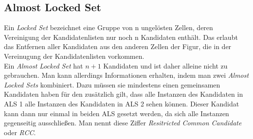 \newpage
\subsection{Almost Locked Set}
Ein \textit{Locked Set} bezeichnet eine Gruppe von n ungelösten Zellen, deren Vereinigung der Kandidatenlisten nur noch n Kandidaten enthält. Das erlaubt das Entfernen aller Kandidaten aus den anderen Zellen der Figur, die in der Vereinugung der Kandidatenlisten vorkommen.\\
Ein \textit{Almost Locked Set} hat $n+1$ Kandidaten und ist daher alleine nicht zu gebrauchen. Man kann allerdings Informationen erhalten, indem man zwei \textit{Almost Locked Sets} kombiniert. Dazu müssen sie mindestens einen gemeinsamen Kandidaten haben für den zusätzlich gilt, dass alle Instanzen des Kandidaten in ALS 1 alle Instanzen des Kandidaten in ALS 2 sehen können. Dieser Kandidat kann dann nur einmal in beiden ALS gesetzt werden, da sich alle Instanzen gegenseitig ausschließen. Man nennt diese Ziffer \textit{Resitricted Common Candidate} oder \textit{RCC}.